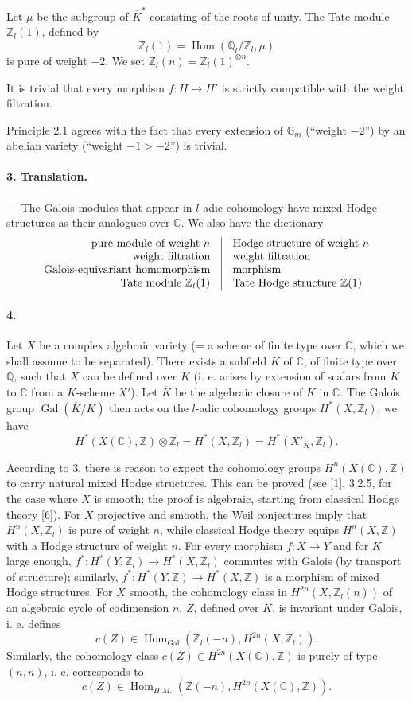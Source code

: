 \documentclass[10pt]{article}
\newcommand{\C}{\mathbb C}
\newcommand{\Q}{\mathbb Q}
\newcommand{\Z}{\mathbb Z}
\newcommand{\Gm}{\mathbb G_m}
\newcommand{\Gal}{\operatorname{Gal}}
\newcommand{\Hom}{\operatorname{Hom}}
\newcommand{\barK}{\overline{K}}
\begin{document}
Let $\mu$ be the subgroup of $\barK^*$ consisting of the roots of unity. The Tate module $\Z_l(1)$, defined by
\[
\Z_l(1)=\Hom(\Q_l/\Z_l,\mu)
\]
is pure of weight $-2$. We set $\Z_l(n)=\Z_l(1)^{\otimes n}$.

It is trivial that every morphism $f:H\to H'$ is strictly compatible with the weight filtration.

Principle 2.1 agrees with the fact that every extension of $\Gm$ (“weight $-2$”) by an abelian variety (“weight $-1>-2$”) is trivial.

\paragraph{3. Translation.} — The Galois modules that appear in $l$-adic cohomology have mixed Hodge structures as their analogues over $\C$. We also have the dictionary
\[
\begin{array}{r@{\quad\vrule\quad}l}
\text{pure module of weight }n & \text{Hodge structure of weight }n\\
\text{weight filtration} & \text{weight filtration}\\
\text{Galois-equivariant homomorphism} & \text{morphism}\\
\text{Tate module }\Z_l(1) & \text{Tate Hodge structure }\Z(1)
\end{array}
\]

\paragraph{4.} Let $X$ be a complex algebraic variety (= a scheme of finite type over $\C$, which we shall assume to be separated). There exists a subfield $K$ of $\C$, of finite type over $\Q$, such that $X$ can be defined over $K$ (i. e. arises by extension of scalars from $K$ to $\C$ from a $K$-scheme $X'$). Let $\barK$ be the algebraic closure of $K$ in $\C$. The Galois group $\Gal(\barK/K)$ then acts on the $l$-adic cohomology groups $H^*(X,\Z_l)$; we have
\[
H^*(X(\C),\Z)\otimes\Z_l=H^*(X,\Z_l)=H^*(X'_{\barK},\Z_l).
\]

According to 3, there is reason to expect the cohomology groups $H^n(X(\C),\Z)$ to carry natural mixed Hodge structures. This can be proved (see [1], 3.2.5, for the case where $X$ is smooth; the proof is algebraic, starting from classical Hodge theory [6]). For $X$ projective and smooth, the Weil conjectures imply that $H^n(X,\Z_l)$ is pure of weight $n$, while classical Hodge theory equips $H^n(X,\Z)$ with a Hodge structure of weight $n$. For every morphism $f:X\to Y$ and for $K$ large enough, $f^*:H^*(Y,\Z_l)\to H^*(X,\Z_l)$ commutes with Galois (by transport of structure); similarly, $f^*:H^*(Y,\Z)\to H^*(X,\Z)$ is a morphism of mixed Hodge structures. For $X$ smooth, the cohomology class in $H^{2n}(X,\Z_l(n))$ of an algebraic cycle of codimension $n$, $Z$, defined over $K$, is invariant under Galois, i. e. defines
\[
c(Z)\in\Hom_{\Gal}(\Z_l(-n),H^{2n}(X,\Z_l)).
\]
Similarly, the cohomology class $c(Z)\in H^{2n}(X(\C),\Z)$ is purely of type $(n,n)$, i. e. corresponds to
\[
c(Z)\in\Hom_{H.M.}(\Z(-n),H^{2n}(X(\C),\Z)).
\]
\end{document}

